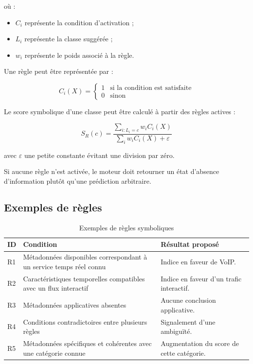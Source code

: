 où :

\begin{itemize}
    \item $C_i$ représente la condition d'activation ;
    \item $L_i$ représente la classe suggérée ;
    \item $w_i$ représente le poids associé à la règle.
\end{itemize}

Une règle peut être représentée par :

\[
C_i(X)=
\begin{cases}
1 & \text{si la condition est satisfaite}\\
0 & \text{sinon}
\end{cases}
\]

Le score symbolique d'une classe peut être calculé
à partir des règles actives :

\[
S_R(c)=
\frac{
\sum_{i:L_i=c}w_iC_i(X)
}{
\sum_i w_iC_i(X)+\varepsilon
}
\]

avec $\varepsilon$ une petite constante évitant
une division par zéro.

Si aucune règle n'est activée, le moteur doit retourner
un état d'absence d'information plutôt qu'une prédiction
arbitraire.

\subsection{Exemples de règles}

\begin{table}[H]
\centering
\caption{Exemples de règles symboliques}
\label{tab:regles}
\begin{tabularx}{\textwidth}{|l|X|X|}
\hline
\textbf{ID} & \textbf{Condition} &
\textbf{Résultat proposé} \\
\hline
R1 &
Métadonnées disponibles correspondant à un service
temps réel connu &
Indice en faveur de VoIP. \\
\hline
R2 &
Caractéristiques temporelles compatibles avec
un flux interactif &
Indice en faveur d'un trafic interactif. \\
\hline
R3 &
Métadonnées applicatives absentes &
Aucune conclusion applicative. \\
\hline
R4 &
Conditions contradictoires entre plusieurs règles &
Signalement d'une ambiguïté. \\
\hline
R5 &
Métadonnées spécifiques et cohérentes avec une
catégorie connue &
Augmentation du score de cette catégorie. \\
\hline
\end{tabularx}
\end{table}

